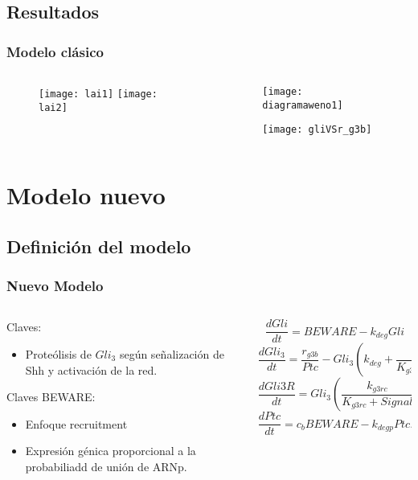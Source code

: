 \documentclass{beamer}
\begin{document}
\subsection{Resultados}
\begin{frame}
\frametitle{Modelo clásico}
\begin{columns}
	\begin{column}{0.5\textwidth}
		\begin{figure}
			\texttt{[image: lai1]}
			\texttt{[image: lai2]}
		\end{figure}
	\end{column}
	\begin{column}{0.5\textwidth}
		\begin{figure}
			\texttt{[image: diagramaweno1]}
			
			\texttt{[image: gliVSr\_g3b]}
		\end{figure}
	\end{column}
\end{columns}
\end{frame}

\section{Modelo nuevo}

\subsection{Definición del modelo}

\begin{frame}
\frametitle{Nuevo Modelo}
\begin{columns}
	\begin{column}{0.5\textwidth}
		Claves:
		\begin{itemize}
			\item Proteólisis de $Gli_3$ según señalización de Shh y activación de la red.
		\end{itemize}
		Claves BEWARE:
		\begin{itemize}
			\item Enfoque recruitment
			\item Expresión génica proporcional a la probabiliadd de unión de ARNp.
		\end{itemize}
	\end{column}
	\begin{column}{0.5\textwidth}
		{\tiny\[ \frac{dGli}{dt} = BEWARE-k_{deg}Gli \]}
		{\tiny\[ \frac{dGli_3}{dt} = \frac{r_{g3b}}{Ptc}-Gli_3\left(k_{deg}+\frac{k_{g3rc}}{K_{g3rc}+Signal}\right), \]}
		{\tiny\[ \frac{dGli3R}{dt}= Gli_3\left(\frac{k_{g3rc}}{K_{g3rc}+Signal}\right)-k_{deg}Gli3R, \]}
		{\tiny\[ \frac{dPtc}{dt} = c_bBEWARE-k_{degp}Ptc.\]}
		
	\end{column}
\end{columns}
\end{frame}
\end{document}
